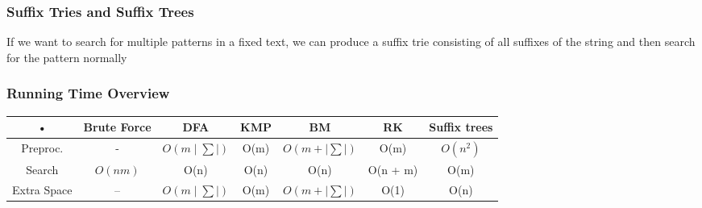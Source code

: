 \documentclass{article}
\begin{document}
\subsubsection*{Suffix Tries and Suffix Trees}
If we want to search for multiple patterns in a fixed text, we can produce a suffix trie consisting of all suffixes of the string and then search for the pattern normally   

\subsubsection*{Running Time Overview}
\begin{tabular}{|c|c|c|c|c|c|c|}
\hline 
• & Brute Force & DFA & KMP & BM & RK & Suffix trees \\ 
\hline 
Preproc. & - & \(O(m \mid  \sum \mid)\) & O(m) & \(O(m + \mid \sum \mid)\) & O(m) & \(O(n^2)\) \\ 
\hline 
Search  & \(O(nm)\) & O(n) & O(n) & O(n) & O(n + m) & O(m) \\ 
\hline 
Extra Space & -- & \(O(m \mid \sum \mid)\) & O(m) & \(O(m + \mid \sum \mid)\) & O(1) & O(n) \\ 
\hline 
\end{tabular} 
\end{document}

